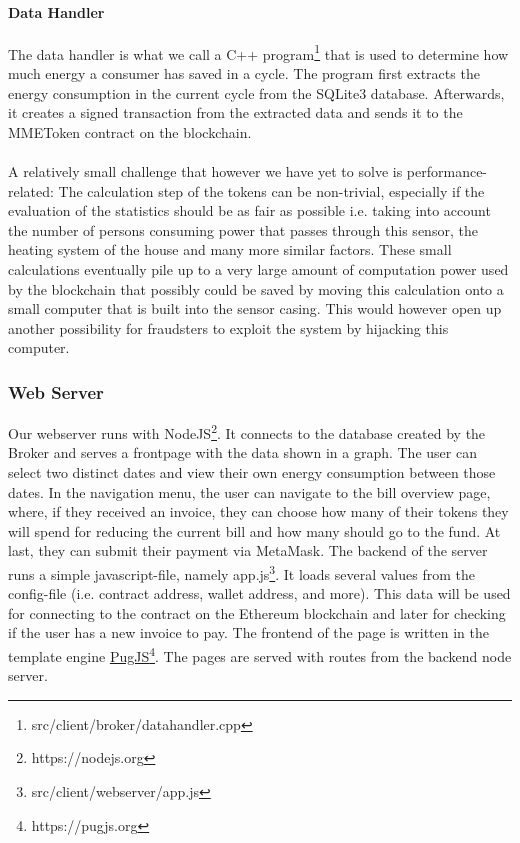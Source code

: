 \documentclass[11pt]{article}
\begin{document}
\paragraph{Data Handler}
The data handler is what we call a C++ program\footnote{src/client/broker/datahandler.cpp} that is used to determine how much energy a consumer has saved in a cycle. The program first extracts the energy consumption in the current cycle from the SQLite3 database. Afterwards, it creates a signed transaction from the extracted data and sends it to the MMEToken contract on the blockchain.\\\\
A relatively small challenge that however we have yet to solve is performance-related: The calculation step of the tokens can be non-trivial, especially if the evaluation of the statistics should be as fair as possible i.e. taking into account the number of persons consuming power that passes through this sensor, the heating system of the house and many more similar factors. These small calculations eventually pile up to a very large amount of computation power used by the blockchain that possibly could be saved by moving this calculation onto a small computer
that is built into the sensor casing. This would however open up another possibility for fraudsters to exploit the system by hijacking this computer.

\subsubsection{Web Server}
Our webserver runs with NodeJS\footnote{https://nodejs.org}. It connects to the database created by the Broker and serves a frontpage with the data shown in a graph. The user can select two distinct dates and view their own energy consumption between those dates. In the navigation menu, the user can navigate to the bill overview page, where, if they received an invoice, they can choose how many of their tokens they will spend for reducing the current bill and how many should go to the fund. At last, they can submit their payment via MetaMask. The backend of the server runs a simple javascript-file, namely app.js\footnote{src/client/webserver/app.js}. It loads several values from the config-file (i.e. contract address, wallet address, and more). This data will be used for connecting to the contract on the Ethereum blockchain and later for checking if the user has a new invoice to pay. The frontend of the page is written in the template engine \hyperref[https://pugjs.org]{PugJS}\footnote{https://pugjs.org}. The pages are served with routes from the backend node server.
\end{document}

